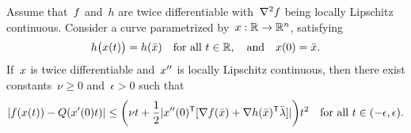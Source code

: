 \begin{theorem}
    \label{thm:sqp-path}
    Assume that~$f$ and~$h$ are twice differentiable with~$\nabla^2 f$ being locally Lipschitz continuous.
    Consider a curve parametrized by~$\iter : \R \to \R^n$, satisfying
    \begin{equation}
        \label{eq:sqp-path}
        h \big( \iter(t) \big) = h(\bar{\iter}) \quad \text{for all~$t \in \R$}, \quad \text{and} \quad \iter(0) = \bar{\iter}.
    \end{equation}
    If~$\iter$ is twice differentiable and~$\iter''$ is locally Lipschitz continuous, then there exist constants~$\nu \ge 0$ and~$\epsilon > 0$ such that
    \begin{equation*}
        \abs{\obj(\iter(t)) - Q(x'(0) t)} \le \bigg( \nu t + \frac{1}{2}\abs{\iter''(0)^{\T} [\nabla \obj(\bar{\iter}) + \nabla h(\bar{\iter})^{\T} \bar{\lm}]} \bigg) t^2 \quad \text{for all~$t \in (-\epsilon, \epsilon)$.}
    \end{equation*}
\end{theorem}

